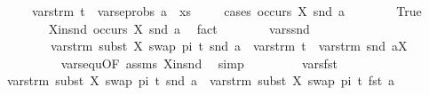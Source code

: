 \begin{isabellebody}
\ \ \ \ {\isasymsubseteq}\ vars{\isacharunderscore}{\kern0pt}trm\ t\ {\isasymunion}\ vars{\isacharunderscore}{\kern0pt}eprobs\ {\isacharparenleft}{\kern0pt}a\ {\isacharhash}{\kern0pt}\ xs{\isacharparenright}{\kern0pt}{\isachardoublequoteclose}\isanewline
\ \ \ \ \isamarkupfalse%
{\isacharparenleft}{\kern0pt}cases\ {\isachardoublequoteopen}occurs\ X\ {\isacharparenleft}{\kern0pt}snd\ a{\isacharparenright}{\kern0pt}{\isachardoublequoteclose}{\isacharparenright}{\kern0pt}\isanewline
\ \ \ \ \ \ \isamarkupfalse%
\ True\isanewline
\ \ \ \ \ \ \isamarkupfalse%
\ X{\isacharunderscore}{\kern0pt}in{\isacharunderscore}{\kern0pt}snd{\isacharcolon}{\kern0pt}\ {\isachardoublequoteopen}occurs\ X\ {\isacharparenleft}{\kern0pt}snd\ a{\isacharparenright}{\kern0pt}{\isachardoublequoteclose}\ \isamarkupfalse%
\ fact\isanewline
\ \ \ \ \ \ \isamarkupfalse%
\ vars{\isacharunderscore}{\kern0pt}snd{\isacharcolon}{\kern0pt}\isanewline
\ \ \ \ \ \ \ \ {\isachardoublequoteopen}vars{\isacharunderscore}{\kern0pt}trm\ {\isacharparenleft}{\kern0pt}subst\ {\isacharbrackleft}{\kern0pt}{\isacharparenleft}{\kern0pt}X{\isacharcomma}{\kern0pt}\ swap\ pi\ t{\isacharparenright}{\kern0pt}{\isacharbrackright}{\kern0pt}\ {\isacharparenleft}{\kern0pt}snd\ a{\isacharparenright}{\kern0pt}{\isacharparenright}{\kern0pt}\ {\isacharequal}{\kern0pt}\ {\isacharparenleft}{\kern0pt}vars{\isacharunderscore}{\kern0pt}trm\ t\ {\isasymunion}\ vars{\isacharunderscore}{\kern0pt}trm\ {\isacharparenleft}{\kern0pt}snd\ a{\isacharparenright}{\kern0pt}{\isacharparenright}{\kern0pt}{\isacharminus}{\kern0pt}{\isacharbraceleft}{\kern0pt}X{\isacharbraceright}{\kern0pt}{\isachardoublequoteclose}\isanewline
\ \ \ \ \ \ \ \ \isamarkupfalse%
\ vars{\isacharunderscore}{\kern0pt}equ{\isacharbrackleft}{\kern0pt}OF\ assms\ X{\isacharunderscore}{\kern0pt}in{\isacharunderscore}{\kern0pt}snd{\isacharbrackright}{\kern0pt}\ \isamarkupfalse%
\ simp\isanewline
\ \ \ \ \ \ \ \isamarkupfalse%
\ vars{\isacharunderscore}{\kern0pt}fst\isanewline
\ \ \ \ \ \ \isamarkupfalse%
\ {\isachardoublequoteopen}vars{\isacharunderscore}{\kern0pt}trm\ {\isacharparenleft}{\kern0pt}subst\ {\isacharbrackleft}{\kern0pt}{\isacharparenleft}{\kern0pt}X{\isacharcomma}{\kern0pt}\ swap\ pi\ t{\isacharparenright}{\kern0pt}{\isacharbrackright}{\kern0pt}\ {\isacharparenleft}{\kern0pt}snd\ a{\isacharparenright}{\kern0pt}{\isacharparenright}{\kern0pt}\ {\isasymunion}\ vars{\isacharunderscore}{\kern0pt}trm\ {\isacharparenleft}{\kern0pt}subst\ {\isacharbrackleft}{\kern0pt}{\isacharparenleft}{\kern0pt}X{\isacharcomma}{\kern0pt}\ swap\ pi\ t{\isacharparenright}{\kern0pt}{\isacharbrackright}{\kern0pt}\ {\isacharparenleft}{\kern0pt}fst\ a{\isacharparenright}{\kern0pt}{\isacharparenright}{\kern0pt}\ \ {\isacharequal}{\kern0pt}\ \isanewline

\end{isabellebody}
